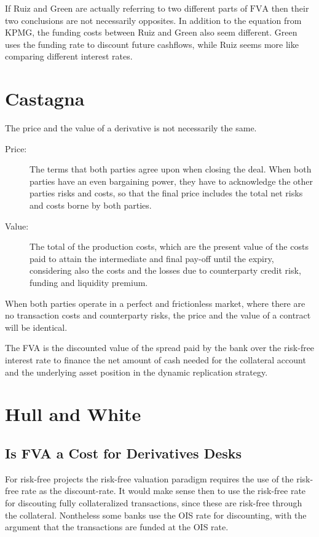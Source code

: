 \documentclass[10pt,a4paper]{article}
\begin{document}
\begin{description}
            If Ruiz and Green are actually referring to two different parts of $\text{FVA}$ then their two conclusions are not necessarily opposites. In addition to the equation from KPMG, the funding costs between Ruiz and Green also seem different. Green uses the funding rate to discount future cashflows, while Ruiz seems more like comparing different interest rates. 

        \end{description}

     \section{Castagna}
        The price and the value of a derivative is not necessarily the same.

        \begin{description}
            \item[Price:] The terms that both parties agree upon when closing the deal. When both parties have an even bargaining power, they have to acknowledge the other parties risks and costs, so that the final price includes the total net risks and costs borne by both parties.
            \item[Value:] The total of the production costs, which are the present value of the costs paid to attain the intermediate and final pay-off until the expiry, considering also the costs and the losses due to counterparty credit risk, funding and liquidity premium.
        \end{description}

        When both parties operate in a perfect and frictionless market, where there are no transaction costs and counterparty risks, the price and the value of a contract will be identical.

        The FVA is the discounted value of the spread paid by the bank over the risk-free interest rate to finance the net amount of cash needed for the collateral account and the underlying asset position in the dynamic replication strategy.

    \section{Hull and White}
    \subsection{Is FVA a Cost for Derivatives Desks}
        For risk-free projects the risk-free valuation paradigm requires the use of the risk-free rate as the discount-rate. It would make sense then to use the risk-free rate for discouting fully collateralized transactions, since these are risk-free through the collateral. Nontheless some banks use the OIS rate for discounting, with the argument that the transactions are funded at the OIS rate. 
\end{document}
